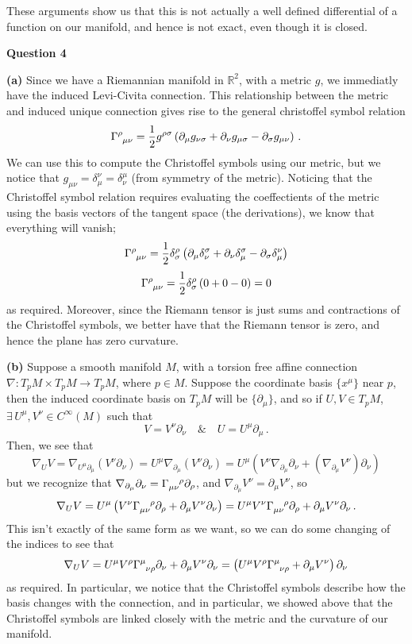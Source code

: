 \documentclass[10pt]{article}
\newcommand{\R}{\mathbb{R}}
\begin{document}
These arguments show us that this is not actually a well defined differential of a function on our manifold, and hence is not exact, even though it is closed.

\newpage
\textbf{Question 4}

\textbf{(a)} Since we have a Riemannian manifold in $\R^{2}$, with a metric $g$, we immediatly have the induced Levi-Civita connection. This relationship between the metric and induced unique connection gives rise to the general christoffel symbol relation
\[ \tensor{\Gamma}{^{\rho}_{\mu\nu}} = \frac{1}{2}g^{\rho\sigma}\left(\partial_{\mu}g_{\nu\sigma} + \partial_{\nu}g_{\mu\sigma} - \partial_{\sigma}g_{\mu\nu}\right)\, .\]
We can use this to compute the Christoffel symbols using our metric, but we notice that $g_{\mu\nu} = \delta_{\mu}^{\nu} = \delta_{\nu}^{\mu}$ (from symmetry of the metric). Noticing that the Christoffel symbol relation requires evaluating the coeffectients of the metric using the basis vectors of the tangent space (the derivations), we know that everything will vanish;
\[ \tensor{\Gamma}{^{\rho}_{\mu\nu}} = \frac{1}{2}\delta^{\rho}_{\sigma}\left(\partial_{\mu}\delta_{\nu}^{\sigma} + \partial_{\nu}\delta_{\mu}^{\sigma} - \partial_{\sigma}\delta_{\mu}^{\nu}\right)\]
\[ \tensor{\Gamma}{^{\rho}_{\mu\nu}} = \frac{1}{2}\delta^{\rho}_{\sigma}\left( 0 + 0 - 0\right) = 0 \]
as required. Moreover, since the Riemann tensor is just sums and contractions of the Christoffel symbols, we better have that the Riemann tensor is zero, and hence the plane has zero curvature. 

\textbf{(b)} Suppose a smooth manifold $M$, with a torsion free affine connection $\nabla: T_{p}M\times T_{p}M \to T_{p}M$, where $p\in M$. Suppose the coordinate basis $\{x^{\mu}\}$ near $p$, then the induced coordinate basis on $T_{p}M$ will be $\{\partial_{\mu}\}$, and so if $U,V \in T_{p}M$, $\exists\, U^{\mu},V^{\nu} \in C^{\infty}(M)$ such that
\[ V = V^{\nu}\partial_{\nu} \quad \& \quad U = U^{\mu}\partial_{\mu} \, .\]
Then, we see that
\[ \nabla_{U}V = \nabla_{U^{\mu}\partial_{\mu}}(V^{\nu}\partial_{\nu}) = U^{\mu}\nabla_{\partial_{\mu}}(V^{\nu}\partial_{\nu}) = U^{\mu}\left(V^{\nu}\nabla_{\partial_{\mu}}\partial_{\nu} + (\nabla_{\partial_{\mu}}V^{\nu})\partial_{\nu}\right) \]
but we recognize that $\nabla_{\partial_{\mu}}\partial_{\nu} = \tensor{\Gamma}{_{\mu\nu}^{\rho}}\partial_{\rho}$, and $\nabla_{\partial_{\mu}}V^{\nu} = \partial_{\mu}V^{\nu}$, so
\[\nabla_{U}V =  U^{\mu}\left(V^{\nu}\tensor{\Gamma}{_{\mu\nu}^{\rho}}\partial_{\rho} + \partial_{\mu}V^{\nu}\partial_{\nu}\right) = U^{\mu}V^{\nu}\tensor{\Gamma}{_{\mu\nu}^{\rho}}\partial_{\rho} + \partial_{\mu}V^{\nu}\partial_{\nu}\, . \]
This isn't exactly of the same form as we want, so we can do some changing of the indices to see that
\[\nabla_{U}V = U^{\mu}V^{\rho}\tensor{\Gamma}{^{\mu}_{\nu\rho}}\partial_{\nu} + \partial_{\mu}V^{\nu}\partial_{\nu} = \left(U^{\mu}V^{\rho}\tensor{\Gamma}{^{\mu}_{\nu\rho}} + \partial_{\mu}V^{\nu}\right)\partial_{\nu}\]
as required. In particular, we notice that the Christoffel symbols describe how the basis changes with the connection, and in particular, we showed above that the Christoffel symbols are linked closely with the metric and the curvature of our manifold.
\end{document}
